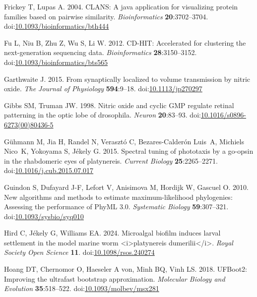 \documentclass[
  11pt,
  letterpaper,
  DIV=11,
  numbers=noendperiod]{scrartcl}
\newlength{\cslhangindent}
\newenvironment{CSLReferences}[2] %
 {\begin{list}{}{%
  \setlength{\itemindent}{0pt}
  \setlength{\leftmargin}{0pt}
  \setlength{\parsep}{0pt}
  \ifodd #1
   \setlength{\leftmargin}{\cslhangindent}
   \setlength{\itemindent}{-1\cslhangindent}
  \fi
  \setlength{\itemsep}{#2\baselineskip}}}
 {\end{list}}
\begin{document}
\begin{CSLReferences}{1}{0}
Frickey T, Lupas A. 2004. CLANS: A java application for visualizing
protein families based on pairwise similarity. \emph{Bioinformatics}
\textbf{20}:3702--3704.
doi:\href{https://doi.org/10.1093/bioinformatics/bth444}{10.1093/bioinformatics/bth444}

Fu L, Niu B, Zhu Z, Wu S, Li W. 2012. CD-HIT: Accelerated for clustering
the next-generation sequencing data. \emph{Bioinformatics}
\textbf{28}:3150--3152.
doi:\href{https://doi.org/10.1093/bioinformatics/bts565}{10.1093/bioinformatics/bts565}

Garthwaite J. 2015. From synaptically localized to volume transmission
by nitric oxide. \emph{The Journal of Physiology} \textbf{594}:9--18.
doi:\href{https://doi.org/10.1113/jp270297}{10.1113/jp270297}

Gibbs SM, Truman JW. 1998. Nitric oxide and cyclic GMP regulate retinal
patterning in the optic lobe of drosophila. \emph{Neuron}
\textbf{20}:83--93.
doi:\href{https://doi.org/10.1016/s0896-6273(00)80436-5}{10.1016/s0896-6273(00)80436-5}

Gühmann M, Jia H, Randel N, Verasztó C, Bezares-Calderón Luis~A,
Michiels Nico~K, Yokoyama S, Jékely G. 2015. Spectral tuning of
phototaxis by a go-opsin in the rhabdomeric eyes of platynereis.
\emph{Current Biology} \textbf{25}:2265--2271.
doi:\href{https://doi.org/10.1016/j.cub.2015.07.017}{10.1016/j.cub.2015.07.017}

Guindon S, Dufayard J-F, Lefort V, Anisimova M, Hordijk W, Gascuel O.
2010. New algorithms and methods to estimate maximum-likelihood
phylogenies: Assessing the performance of PhyML 3.0. \emph{Systematic
Biology} \textbf{59}:307--321.
doi:\href{https://doi.org/10.1093/sysbio/syq010}{10.1093/sysbio/syq010}

Hird C, Jékely G, Williams EA. 2024. Microalgal biofilm induces larval
settlement in the model marine worm \textless i\textgreater platynereis
dumerilii\textless/i\textgreater. \emph{Royal Society Open Science}
\textbf{11}.
doi:\href{https://doi.org/10.1098/rsos.240274}{10.1098/rsos.240274}

Hoang DT, Chernomor O, Haeseler A von, Minh BQ, Vinh LS. 2018. UFBoot2:
Improving the ultrafast bootstrap approximation. \emph{Molecular Biology
and Evolution} \textbf{35}:518--522.
doi:\href{https://doi.org/10.1093/molbev/msx281}{10.1093/molbev/msx281}


\end{CSLReferences}
\end{document}
